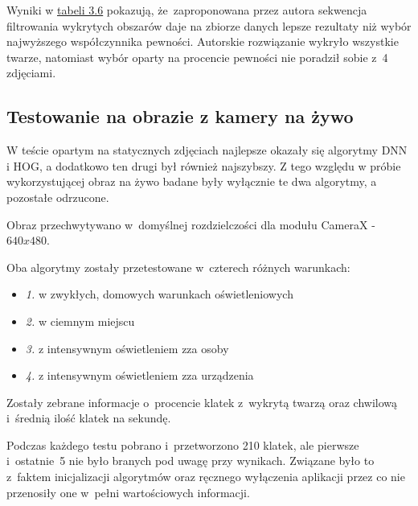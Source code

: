 \par

\vspace{5mm}



Wyniki w \hyperref[{tab:face_filter_test}]{tabeli 3.6} pokazują, że~zaproponowana przez autora sekwencja filtrowania wykrytych obszarów daje na zbiorze danych lepsze rezultaty niż wybór najwyższego współczynnika pewności. Autorskie rozwiązanie wykryło wszystkie twarze, natomiast wybór oparty na procencie pewności nie poradził sobie z~4 zdjęciami.


\subsection{Testowanie na obrazie z kamery na żywo} \label{section:face_detection_test_live}

W teście opartym na statycznych zdjęciach najlepsze okazały się algorytmy DNN i HOG, a dodatkowo ten drugi był również najszybszy. Z tego względu w próbie wykorzystującej obraz na żywo badane były wyłącznie te dwa algorytmy, a pozostałe odrzucone.

\par

Obraz przechwytywano w~domyślnej rozdzielczości dla modułu CameraX - $640x480$.

\par

Oba algorytmy zostały przetestowane w~czterech różnych warunkach:

\begin{itemize}
    \item \textit{1.} w zwykłych, domowych warunkach oświetleniowych
    \item \textit{2.} w ciemnym miejscu
    \item \textit{3.} z intensywnym oświetleniem zza osoby 
    \item \textit{4.} z intensywnym oświetleniem zza urządzenia
\end{itemize}

Zostały zebrane informacje o~procencie klatek z~wykrytą twarzą oraz chwilową i~średnią ilość klatek na sekundę. 

\par

Podczas każdego testu pobrano i~przetworzono 210 klatek, ale pierwsze i~ostatnie~5 nie było branych pod uwagę przy wynikach. Związane było to z~faktem inicjalizacji algorytmów oraz ręcznego wyłączenia aplikacji przez co nie przenosiły one w~pełni wartościowych informacji.




